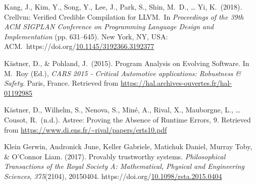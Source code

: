 \documentclass[12pt,twoside]{article}
\begin{document}
{\begin{thebibliography}{222}
\mdbibitemlabel{[Kang et al., 2018]}Kang, J., Kim, Y., Song, Y., Lee, J., Park, S., Shin, M.~D., … Yi, K.~(2018). Crellvm: Verified Credible Compilation for LLVM.~In \emph{Proceedings of the 39th ACM SIGPLAN Conference on Programming Language Design and Implementation} (pp. 631–645). New York, NY, USA: ACM.~https://doi.org/\href{https://dx.doi.org/10.1145/3192366.3192377}{10.1145/3192366.3192377}\label{kang_crellvm:_2018}%

Kästner, D., \& Pohland, J.~(2015). Program Analysis on Evolving Software. In M.~Roy (Ed.), \emph{CARS 2015 - Critical Automotive applications: Robustness \& Safety}. Paris, France. Retrieved from \href{https://hal.archives-ouvertes.fr/hal-01192985}{{\ttfamily https://\hspace{0pt}hal.\hspace{0pt}archives-\hspace{0pt}ouvertes.\hspace{0pt}fr/\hspace{0pt}hal-\hspace{0pt}01192985}}\label{kastner_program_2015}%

\mdbibitemlabel{[D Kästner et al., n.d.]}Kästner, D., Wilhelm, S., Nenova, S., Miné, A., Rival, X., Mauborgne, L., … Cousot, R.~(n.d.). Astree: Proving the Absence of Runtime Errors, 9. Retrieved from \href{https://www.di.ens.fr/~rival/papers/erts10.pdf}{{\ttfamily https://\hspace{0pt}www.\hspace{0pt}di.\hspace{0pt}ens.\hspace{0pt}fr/\hspace{0pt}\textasciitilde{}rival/\hspace{0pt}papers/\hspace{0pt}erts10.\hspace{0pt}pdf}}\label{kastner_astree:_nodate}%

Klein Gerwin, Andronick June, Keller Gabriele, Matichuk Daniel, Murray Toby, \& O’Connor Liam. (2017). Provably trustworthy systems. \emph{Philosophical Transactions of the Royal Society A: Mathematical, Physical and Engineering Sciences}, \emph{375}(2104), 20150404. https://doi.org/\href{https://dx.doi.org/10.1098/rsta.2015.0404}{10.1098/rsta.2015.0404}\label{klein_gerwin_provably_2017}%


\end{thebibliography}}
\end{document}

